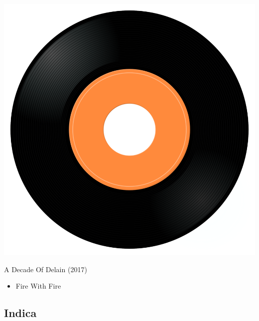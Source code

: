 \begin{minipage}[t]{0.25\textwidth}\vspace{0pt}
\captionsetup{type=figure}
\includegraphics[width=\textwidth]{Images/cover.png}
\caption*{A Decade Of Delain  (2017)}
\end{minipage}
\begin{minipage}[t]{0.25\textwidth}\vspace{0pt}
\begin{itemize}[nosep,leftmargin=1em,labelwidth=*,align=left]
	\setlength{\itemsep}{0pt}
	\item Fire With Fire 
\end{itemize}
\end{minipage}

\subsection{Indica}

